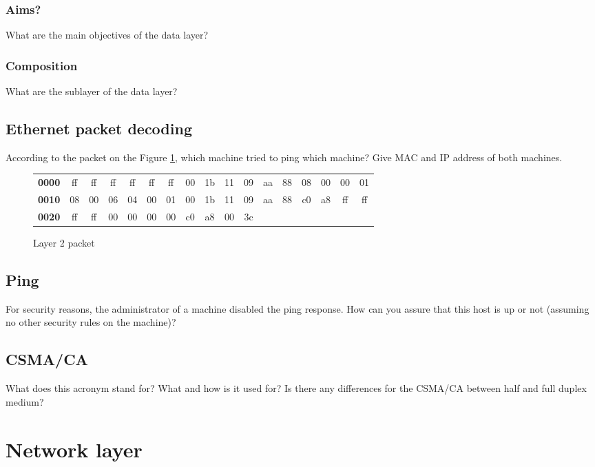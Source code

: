 \documentclass[11pt]{article}
\begin{document}
\subsubsection{Aims?}
What are the main objectives of the data layer?
\subsubsection{Composition}
What are the sublayer of the data layer?
\subsection{Ethernet packet decoding}
According to the packet on the Figure \ref{fig:arp_req_ex}, which machine tried to ping which machine? Give MAC and IP address of both machines.
  \begin{figure}[h]
  \centering
  \resizebox{16cm}{!} {
    \begin{tabular}{lcccccccccccccccc}
      \textbf{0000} & ff & ff & ff & ff & ff & ff & 00 & 1b     & 11 & 09 & aa & 88 & 08 & 00 & 00 & 01 \\
      \textbf{0010} & 08 & 00 & 06 & 04 & 00 & 01 & 00 & 1b     & 11 & 09 & aa & 88 & c0 & a8 & ff & ff \\
      \textbf{0020} & ff & ff & 00 & 00 & 00 & 00 & c0 & a8     & 00 & 3c \\
    \end{tabular}
  }
  \caption{Layer 2 packet}
  \label{fig:arp_req_ex}
  \end{figure}
\subsection{Ping}
For security reasons, the administrator of a machine disabled the ping response. How can you assure that this host is up or not (assuming no other security rules on the machine)?
\subsection{CSMA/CA}
What does this acronym stand for? What and how is it used for? Is there any differences for the CSMA/CA between half and full duplex medium?

\section{Network layer}
\end{document}
